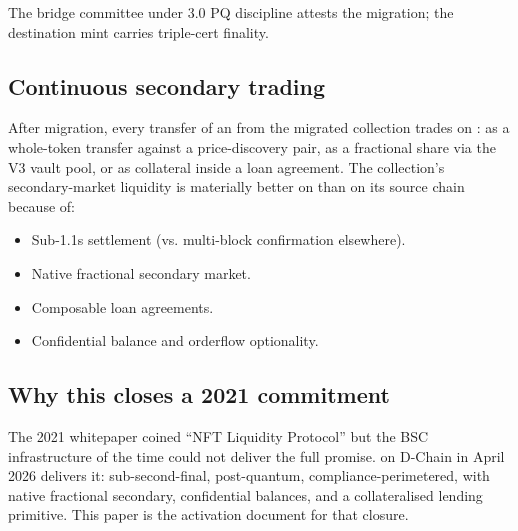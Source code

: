 The bridge committee under \Zoo{} 3.0 PQ discipline \cite{zoo-3-0}
attests the migration; the destination mint carries triple-cert
finality.

\subsection{Continuous secondary trading}

After migration, every transfer of an \NFT{} from the migrated
collection trades on \Zoo{} \DEX{}: as a whole-token transfer
against a price-discovery pair, as a fractional share via the V3
vault pool, or as collateral inside a loan agreement. The
collection's secondary-market liquidity is materially better on
\Zoo{} \DEX{} than on its source chain because of:

\begin{itemize}[leftmargin=1.2em]
  \item Sub-1.1s settlement (vs. multi-block confirmation
        elsewhere).
  \item Native fractional secondary market.
  \item Composable loan agreements.
  \item Confidential balance and orderflow optionality.
\end{itemize}

\subsection{Why this closes a 2021 commitment}

The 2021 \Zoo{} whitepaper coined ``NFT Liquidity Protocol'' but
the BSC infrastructure of the time could not deliver the full
promise. \Zoo{} \DEX{} on \Zoo{} D-Chain in April 2026 delivers it:
sub-second-final, post-quantum, compliance-perimetered, with
native fractional secondary, confidential balances, and a
collateralised lending primitive. This paper is the activation
document for that closure.
